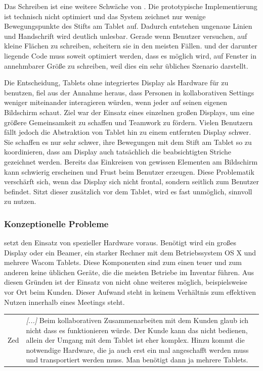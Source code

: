 \medskip Das Schreiben ist eine weitere Schwäche von \scribbler. Die prototypische Implementierung ist technisch nicht optimiert und das System zeichnet nur wenige Bewegungspunkte des Stifts am Tablet auf. Dadurch entstehen ungenaue Linien und Handschrift wird deutlich unlesbar. Gerade wenn Benutzer versuchen, auf kleine Flächen zu schreiben, scheitern sie in den meisten Fällen. \scribbler und der darunter liegende Code muss soweit optimiert werden, dass es möglich wird, auf Fenster in annehmbarer Größe zu schreiben, weil dies ein sehr übliches Szenario darstellt.

\medskip Die Entscheidung, Tablets ohne integriertes Display als Hardware für \scribbler zu benutzen, fiel aus der Annahme heraus, dass Personen in kollaborativen Settings weniger miteinander interagieren würden, wenn jeder auf seinen eigenen Bildschirm schaut. Ziel war der Einsatz eines einzelnen großen Displays, um eine größere Gemeinsamkeit zu schaffen und Teamwork zu fördern. Vielen Benutzern fällt jedoch die Abstraktion von Tablet hin zu einem entfernten Display schwer. Sie schaffen es nur sehr schwer, ihre Bewegungen mit dem Stift am Tablet so zu koordinieren, dass am Display auch tatsächlich die beabsichtigten Striche gezeichnet werden. Bereits das Einkreisen von gewissen Elementen am Bildschirm kann schwierig erscheinen und Frust beim Benutzer erzeugen. Diese Problematik verschärft sich, wenn das Display sich nicht frontal, sondern seitlich zum Benutzer befindet. Sitzt dieser zusätzlich vor dem Tablet, wird es fast unmöglich, \scribbler sinnvoll zu nutzen.

\subsubsection{Konzeptionelle Probleme}
\scribbler setzt den Einsatz von spezieller Hardware voraus. Benötigt wird ein großes Display oder ein Beamer, ein starker Rechner mit dem Betriebssystem OS X und mehrere Wacom Tablets. Diese Komponenten sind zum einen teuer und zum anderen keine üblichen Geräte, die die meisten Betriebe im Inventar führen. Aus diesen Gründen ist der Einsatz von \scribbler nicht ohne weiteres möglich, beispielsweise vor Ort beim Kunden. Dieser Aufwand steht in keinem Verhältnis zum effektiven Nutzen innerhalb eines Meetings steht.

\begin{extract}[Notwendige Hardware schränkt ein.]
	{
		\myfloatalign
		\begin{tabularx}{\textwidth}{p{1.5cm}X}
			Zed & \emph{[...]} Beim kollaborativen Zusammenarbeiten mit dem Kunden glaub ich nicht dass es funktionieren würde. Der Kunde kann das nicht bedienen, allein der Umgang mit dem Tablet ist eher komplex. Hinzu kommt die notwendige Hardware, die ja auch erst ein mal angeschafft werden muss und transportiert werden muss. Man benötigt dann ja mehrere Tablets. 
		\end{tabularx}
	}
\end{extract}

